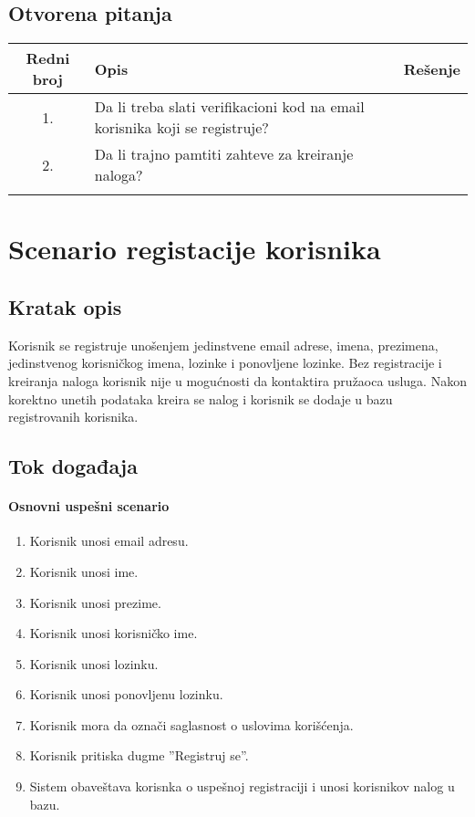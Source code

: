 \documentclass[a4paper,12pt]{report}
\newcommand{\genitivfunkcionalnosti}{registacije korisnika}
\begin{document}
\subsection{Otvorena pitanja}
    \begin{center}
    \begin{tabular}{ |c|p{10cm}|l| }
    \hline
    \textbf{Redni broj} & \hspace{4cm} \textbf{Opis} & \textbf{Rešenje} \\ 
    \hline
         1. & Da li treba slati verifikacioni kod na email 
         korisnika koji se registruje? & \\
         \hline
          2.& Da li trajno pamtiti zahteve za kreiranje naloga? &  \\
         \hline
         & &   \\ 
         \hline
    \end{tabular}
    \end{center}
    
\section{Scenario \genitivfunkcionalnosti}
\subsection{Kratak opis}
    Korisnik se registruje unošenjem jedinstvene email adrese, imena, prezimena, jedinstvenog korisničkog imena, lozinke i ponovljene lozinke. Bez registracije i kreiranja naloga korisnik nije u mogućnosti da kontaktira pružaoca usluga. Nakon korektno unetih podataka kreira se nalog i korisnik se dodaje u bazu registrovanih korisnika. 
    \newpage
\subsection{Tok događaja}
    \paragraph*{Osnovni uspešni scenario}
    \begin{enumerate}
        \item Korisnik unosi email adresu.
        \item Korisnik unosi ime.
        \item Korisnik unosi prezime.
        \item Korisnik unosi korisničko ime.
        \item Korisnik unosi lozinku.
        \item Korisnik unosi ponovljenu lozinku.
        \item Korisnik mora da označi saglasnost o uslovima korišćenja.
        \item Korisnik pritiska dugme ''Registruj se''.
        \item Sistem obaveštava korisnka o uspešnoj registraciji i unosi korisnikov nalog u bazu.
    \end{enumerate}
\end{document}
